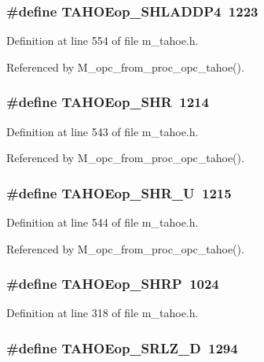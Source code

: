 \subsubsection{\setlength{\rightskip}{0pt plus 5cm}\#define TAHOEop\_\-SHLADDP4~1223}\label{m__tahoe_8h_7a44bbc5af8282be36955e3f7858d156}




Definition at line 554 of file m\_\-tahoe.h.

Referenced by M\_\-opc\_\-from\_\-proc\_\-opc\_\-tahoe().
\subsubsection{\setlength{\rightskip}{0pt plus 5cm}\#define TAHOEop\_\-SHR~1214}\label{m__tahoe_8h_2af4eadaf32a7724514b597cb4073d13}




Definition at line 543 of file m\_\-tahoe.h.

Referenced by M\_\-opc\_\-from\_\-proc\_\-opc\_\-tahoe().
\subsubsection{\setlength{\rightskip}{0pt plus 5cm}\#define TAHOEop\_\-SHR\_\-U~1215}\label{m__tahoe_8h_124643c93ea0198ce0af8b0d9d3a7a33}




Definition at line 544 of file m\_\-tahoe.h.

Referenced by M\_\-opc\_\-from\_\-proc\_\-opc\_\-tahoe().
\subsubsection{\setlength{\rightskip}{0pt plus 5cm}\#define TAHOEop\_\-SHRP~1024}\label{m__tahoe_8h_ace02fe600a8acd481cb19f760ab6464}




Definition at line 318 of file m\_\-tahoe.h.
\subsubsection{\setlength{\rightskip}{0pt plus 5cm}\#define TAHOEop\_\-SRLZ\_\-D~1294}\label{m__tahoe_8h_d5d4a456c72ac078be739ce099a93e31}




